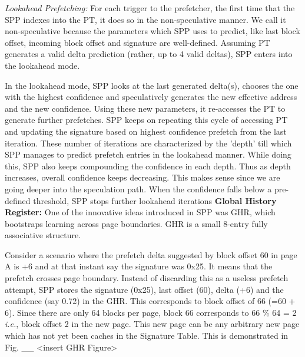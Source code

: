 \documentclass{sig-alternate}
\begin{document}
\textit{Lookahead Prefetching:} For each trigger to the prefetcher, the first time that the SPP indexes into the PT, it does so in the non-speculative manner. We call it non-speculative because the parameters which SPP uses to predict, like last block offset, incoming block offset and signature are well-defined. Assuming PT generates a valid delta prediction (rather, up to 4 valid deltas), SPP enters into the lookahead mode.

In the lookahead mode, SPP looks at the last generated delta(s), chooses the one with the highest confidence and speculatively generates the new effective address and the new confidence. Using these new parameters, it re-accesses the PT to generate further prefetches. SPP keeps on repeating this cycle of accessing PT and updating the signature based on highest confidence prefetch from the last iteration. These number of iterations are characterized by the 'depth' till which SPP manages to predict prefetch entries in the lookahead manner. While doing this, SPP also keeps compounding the confidence in each depth. Thus as depth increases, overall confidence keeps decreasing. This makes sense since we are going deeper into the speculation path. When the confidence falls below a pre-defined threshold, SPP stops further lookahead iterations
\newline
\newline
\textbf{Global History Register:} One of the innovative ideas introduced in SPP was GHR, which bootstraps learning across page boundaries. GHR is a small 8-entry fully associative structure. 

Consider a scenario where the prefetch delta suggested by block offset 60 in page A is +6 and at that instant say the signature was 0x25. It means that the prefetch crosses page boundary. Instead of discarding this as a useless prefetch attempt, SPP stores the signature (0x25), last offset (60), delta (+6) and the confidence (say 0.72) in the GHR. This corresponds to block offset of 66 (=60 + 6). Since there are only 64 blocks per page, block 66 corresponds to 66 \% 64 = 2 \textit{i.e.}, block offset 2 in the new page. This new page can be any arbitrary new page which has not yet been caches in the Signature Table.
This is demonstrated in Fig. \_\_ <insert GHR Figure>
\end{document}
